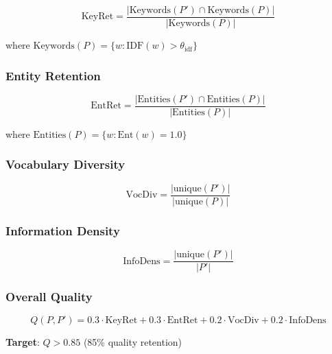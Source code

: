 \begin{equation}
\text{KeyRet} = \frac{|\text{Keywords}(P') \cap \text{Keywords}(P)|}{|\text{Keywords}(P)|}
\end{equation}

where $\text{Keywords}(P) = \{w : \text{IDF}(w) > \theta_{\text{idf}}\}$

\subsubsection{Entity Retention}

\begin{equation}
\text{EntRet} = \frac{|\text{Entities}(P') \cap \text{Entities}(P)|}{|\text{Entities}(P)|}
\end{equation}

where $\text{Entities}(P) = \{w : \text{Ent}(w) = 1.0\}$

\subsubsection{Vocabulary Diversity}

\begin{equation}
\text{VocDiv} = \frac{|\text{unique}(P')|}{|\text{unique}(P)|}
\end{equation}

\subsubsection{Information Density}

\begin{equation}
\text{InfoDens} = \frac{|\text{unique}(P')|}{|P'|}
\end{equation}

\subsubsection{Overall Quality}

\begin{equation}
Q(P, P') = 0.3 \cdot \text{KeyRet} + 0.3 \cdot \text{EntRet} + 0.2 \cdot \text{VocDiv} + 0.2 \cdot \text{InfoDens}
\end{equation}

\textbf{Target}: $Q > 0.85$ (85\% quality retention)
